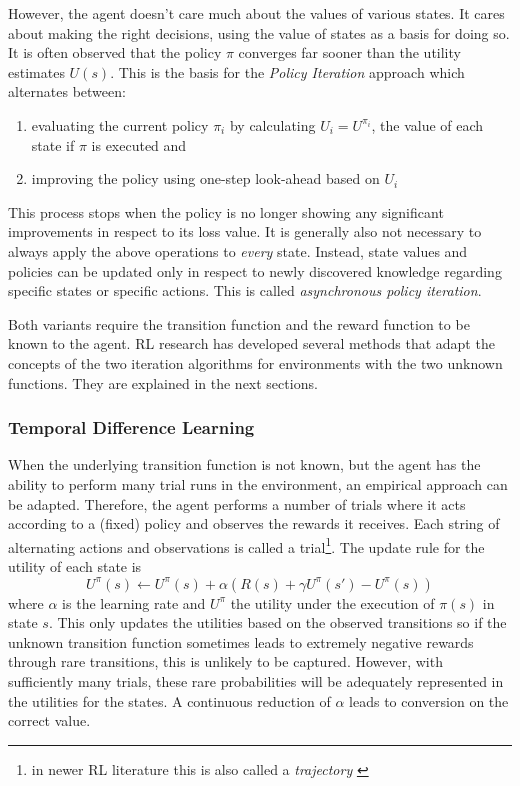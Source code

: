 However, the agent doesn't care much about the values of various states. It cares about making the right
decisions, using the value of states as a basis for doing so. It is often observed that the policy $\pi$ converges far
sooner than the utility estimates $U(s)$. This is the basis for the \emph{Policy Iteration} approach which alternates
between:
\begin{enumerate}
    \item evaluating the current policy $\pi_i$ by calculating $U_i=U^{\pi_i}$, the value of each state if $\pi$ is
        executed and
    \item improving the policy using one-step look-ahead based on $U_i$
\end{enumerate}

This process stops when the policy is no longer showing any significant improvements in respect to its loss value. It is
generally also not necessary to always apply the above operations to \emph{every} state. Instead, state values and
policies can be updated only in respect to newly discovered knowledge regarding specific states or specific actions.
This is called \emph{asynchronous policy iteration}.

Both variants require the transition function and the reward function to be known to the agent. \ac{RL} research has
developed several methods that adapt the concepts of the two iteration algorithms for environments with the two unknown
functions. They are explained in the next sections.

\subsubsection{Temporal Difference Learning}%
\label{sub:temporal_difference_learning}

When the underlying transition function is not known, but the agent has the ability to perform many trial runs in the
environment, an empirical approach can be adapted. Therefore, the agent performs a number of trials where it acts
according to a (fixed) policy and observes the rewards it receives. Each string of alternating actions and observations
is called a trial\footnote{in newer \ac{RL} literature this is also called a \emph{trajectory} \citep{proximalpolicyopt, heess2017emergence} }.
The update rule for the utility of each state is
\begin{equation}
    U^\pi(s) \gets U^\pi(s) + \alpha(R(s) + \gamma U^\pi(s') - U^\pi(s))
\end{equation}
where $\alpha$ is the learning rate and $U^\pi$ the utility under the execution of $\pi(s)$ in state $s$. This only
updates the utilities based on the observed transitions so if the unknown transition function sometimes leads to
extremely negative rewards through rare transitions, this is unlikely to be captured. However, with sufficiently many
trials, these rare probabilities will be adequately represented in the utilities for the states. A continuous reduction
of $\alpha$ leads to conversion on the correct value.

